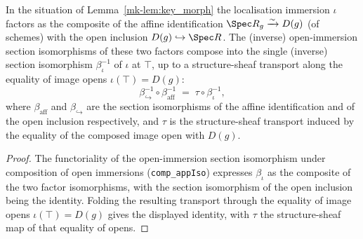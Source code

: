 \begin{lemma}\label{mk-lem:tile_appIso_comp}
  \leanok

  In the situation of Lemma~\ref{mk-lem:key_morph} the localisation immersion \(\iota\) factors as the
  composite of the affine identification \(\Spec R_g \xrightarrow{\sim} D(g)\) (of schemes) with the open
  inclusion \(D(g) \hookrightarrow \Spec R\). The (inverse) open-immersion section isomorphisms of these
  two factors compose into the single (inverse) section isomorphism \(\beta_\iota^{-1}\) of \(\iota\) at
  \(\top\), up to a structure-sheaf transport along the equality of image opens
  \(\iota(\top) = D(g)\):
  \[
    \beta_{\hookrightarrow}^{-1} \circ \beta_{\mathrm{aff}}^{-1}
    \;=\;
    \tau \circ \beta_\iota^{-1},
  \]
  where \(\beta_{\mathrm{aff}}\) and \(\beta_{\hookrightarrow}\) are the section isomorphisms of the
  affine identification and of the open inclusion respectively, and \(\tau\) is the structure-sheaf
  transport induced by the equality of the composed image open with \(D(g)\).
\end{lemma}
\begin{proof}
  \leanok

The functoriality of the open-immersion section isomorphism under composition of open immersions
  (\texttt{comp\_appIso}) expresses \(\beta_\iota\) as the composite of the two factor isomorphisms, with
  the section isomorphism of the open inclusion being the identity. Folding the resulting transport
  through the equality of image opens \(\iota(\top) = D(g)\) gives the displayed identity, with \(\tau\)
  the structure-sheaf map of that equality of opens.
\end{proof}

